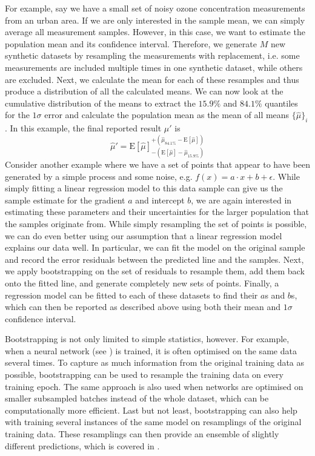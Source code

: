 For example, say we have a small set of noisy ozone concentration measurements from an urban area. If we are only interested in the sample mean, we can simply average all measurement samples. However, in this case, we want to estimate the population mean and its confidence interval. Therefore, we generate $M$ new synthetic datasets by resampling the measurements with replacement, i.e. some measurements are included multiple times in one synthetic dataset, while others are excluded. Next, we calculate the mean for each of these resamples and thus produce a distribution of all the calculated means. We can now look at the cumulative distribution of the means to extract the $15.9\%$ and $84.1\%$ quantiles for the $1\sigma$ error and calculate the population mean as the mean of all means $\{\hat{\mu}\}_{i}$. In this example, the final reported result $\hat{\mu}'$ is
\begin{equation*}
    \hat{\mu}' = {\text{E}[\hat{\mu}]}^{+(\hat{\mu}_{84.1\%} - \text{E}[\hat{\mu}])}_{-(\text{E}[\hat{\mu}] - \hat{\mu}_{15.9\%})} 
\end{equation*}
\noindent Consider another example where we have a set of points that appear to have been generated by a simple process and some noise, e.g. $f(x) = a \cdot x + b + \epsilon$. While simply fitting a linear regression model to this data sample can give us the sample estimate for the gradient $a$ and intercept $b$, we are again interested in estimating these parameters and their uncertainties for the larger population that the samples originate from. While simply resampling the set of points is possible, we can do even better using our assumption that a linear regression model explains our data well. In particular, we can fit the model on the original sample and record the error residuals between the predicted line and the samples. Next, we apply bootstrapping on the set of residuals to resample them, add them back onto the fitted line, and generate completely new sets of points. Finally, a regression model can be fitted to each of these datasets to find their $a$s and $b$s, which can then be reported as described above using both their mean and $1\sigma$ confidence interval.

\newpar Bootstrapping is not only limited to simple statistics, however. For example, when a neural network (see ) is trained, it is often optimised on the same data several times. To capture as much information from the original training data as possible, bootstrapping can be used to resample the training data on every training epoch. The same approach is also used when networks are optimised on smaller subsampled batches instead of the whole dataset, which can be computationally more efficient. Last but not least, bootstrapping can also help with training several instances of the same model on resamplings of the original training data. These resamplings can then provide an ensemble of slightly different predictions, which is covered in .

